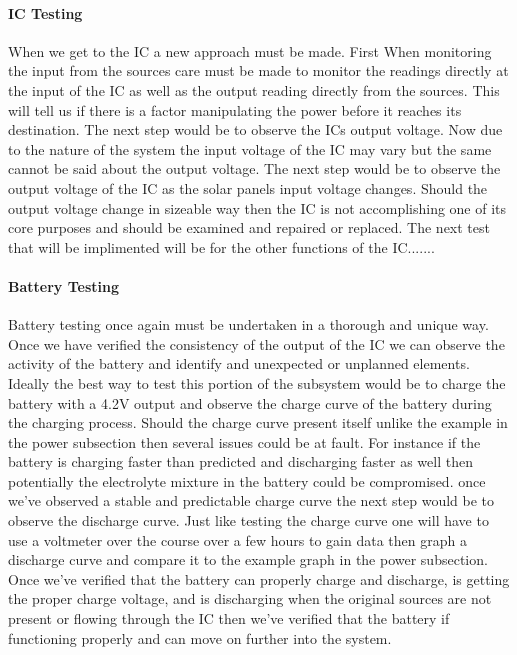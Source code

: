 \paragraph{IC Testing}
When we get to the IC a new approach must be made. First When monitoring the input from the sources care must be made to monitor the readings directly at the input of the IC as well as the output reading directly from the sources. This will tell us if there is a factor manipulating the power before it reaches its destination. The next step would be to observe the ICs output voltage. Now due to the nature of the system the input voltage of the IC may vary but the same cannot be said about the output voltage. The next step would be to observe the output voltage of the IC as the solar panels input voltage changes. Should the output voltage change in sizeable way then the IC is not accomplishing one of its core purposes and should be examined and repaired or replaced. The next test that will be implimented will be for the other functions of the IC.......

\paragraph{Battery Testing}
Battery testing once again must be undertaken in a thorough and unique way. Once we have verified the consistency of the output of the IC we can observe the activity of the battery and identify and unexpected or unplanned elements. Ideally the best way to test this portion of the subsystem would be to charge the battery with a 4.2V output and observe the charge curve of the battery during the charging process. Should the charge curve present itself unlike the example in the power subsection then several issues could be at fault. For instance if the battery is charging faster than predicted and discharging faster as well then potentially the electrolyte mixture in the battery could be compromised. once we've observed a stable and predictable charge curve the next step would be to observe the discharge curve. Just like testing the charge curve one will have to use a voltmeter over the course over a few hours to gain data then graph a discharge curve and compare it to the example graph in the power subsection. Once we've verified that the battery can properly charge and discharge, is getting the proper charge voltage, and is discharging when the original sources are not present or flowing through the IC then we've verified that the battery if functioning properly and can move on further into the system.
